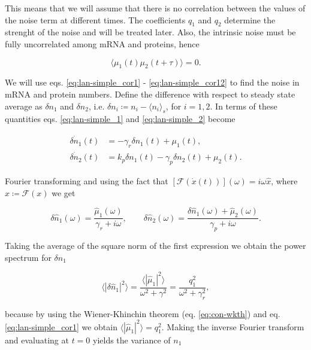 This means that we will assume that there is no correlation between the values of the noise term at different times. The coefficients $q_1$ and $q_2$ determine the strenght of the noise and will be treated later. Also, the intrinsic noise must be fully uncorrelated among mRNA and proteins, hence

\begin{equation}
  \langle\mu_1(t)\mu_2(t+\tau)\rangle = 0. \label{eq:lan-simple_cor12}
\end{equation}

We will use eqs. \eqref{eq:lan-simple_cor1} - \eqref{eq:lan-simple_cor12} to find the noise in mRNA and protein numbers. Define the difference with respect to steady state average as $\delta n_1$ and $\delta n_2$, i.e. $\delta n_i \coloneqq n_i - \langle n_i\rangle_s$, for $i=1,2$. In terms of these quantities eqs. \eqref{eq:lan-simple_1} and \eqref{eq:lan-simple_2} become

\begin{align}
  \dot{\delta n_1}(t) &= -\gamma_r\delta n_1(t) + \mu_1(t)\label{eq:lan-simple_d1},\\
  \dot{\delta n_2}(t) &= k_p\delta n_1(t) -\gamma_p\delta n_2(t) + \mu_2(t)\label{eq:lan-simple_d2}.
\end{align}

Fourier transforming and using the fact that $\left[\mathscr{F}(\dot{x}(t))\right](\omega) = i\omega \hat{x}$, where $\hat{x}\coloneqq\mathscr{F}(x)$ we get 

\begin{equation}
  \label{eq:lan-nfourier}
  \delta\hat{n}_1(\omega) = \frac{\hat{\mu}_1(\omega)}{\gamma_r+i\omega},\quad\quad \delta\hat{n}_2(\omega) = \frac{\delta\hat{n}_1(\omega) + \hat{\mu}_2(\omega)}{\gamma_p+i\omega}.
\end{equation}

Taking the average of the square norm of the first expression we obtain the power spectrum for $\delta n_1$

\begin{equation}
  \label{eq:lan-simple_psd1}
  \langle|\delta\hat{n}_1|^2\rangle = \frac{\langle|\hat{\mu}_1|^2\rangle}{\omega^2+\gamma^2} = \frac{q_1^2}{\omega^2+\gamma_r^2},
\end{equation}

because by using the Wiener-Khinchin theorem (eq. \eqref{eq:con-wkth}) and eq. \eqref{eq:lan-simple_cor1} we obtain $\langle|\hat{\mu}_1|^2\rangle = q_1^2$. Making the inverse Fourier transform and evaluating at $t=0$ yields the variance of $n_1$

